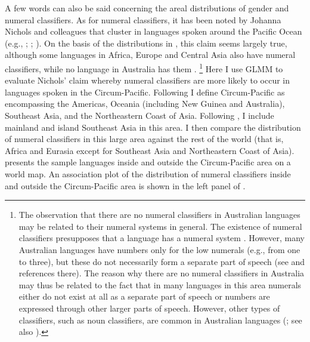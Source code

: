 \documentclass[output=collectionpaper]{langsci/langscibook}
\begin{document}
A few words can also be said concerning the areal distributions of gender and numeral classifiers. As for numeral classifiers, it has been noted by Johanna Nichols and colleagues that  cluster in languages spoken around the Pacific Ocean (e.g., \citealt[132--133]{Nichols1992}; \citealt[366--367]{Nichols1996}; \citealt[299]{Nichols2003}). On the basis of the distributions in , this claim seems largely true, although some languages in Africa, Europe and Central Asia also have numeral classifiers, while no language in Australia has them \citep[121--124]{Aikhenvald2000}.%
\footnote{The observation that there are no numeral classifiers in Australian languages may be related to their numeral systems in general. The existence of numeral classifiers presupposes that a language has a numeral system \citep[99]{Aikhenvald2000}. However, many Australian languages have numbers only for the low numerals (e.g., from one to three), but these do not necessarily form a separate part of speech (see \citealt[100]{Aikhenvald2000} and references there). The reason why there are no numeral classifiers in Australia may thus be related to the fact that in many languages in this area numerals either do not exist at all as a separate part of speech or numbers are expressed through other larger parts of speech. However, other types of classifiers, such as noun classifiers, are common in Australian languages (\citealt[82]{Aikhenvald2000}; see also \citealt{Plaster2007}).} %
Here I use GLMM to evaluate Nichols' claim whereby numeral classifiers are more likely to occur in languages spoken in the Circum-Pacific. Following \citet{Bickel2006} I define Circum-Pacific as encompassing the Americas, Oceania (including New Guinea and Australia), Southeast Asia, and the Northeastern Coast of Asia. Following \citet{Nichols2003}, I include mainland and island Southeast Asia in this area. I then compare the distribution of numeral classifiers in this large area against the rest of the world (that is, Africa and Eurasia except for Southeast Asia and Northeastern Coast of Asia).  presents the sample languages inside and outside the Circum-Pacific area on a world map. An association plot of the distribution of numeral classifiers inside and outside the Circum-Pacific area is shown in the left panel of .
\end{document}
